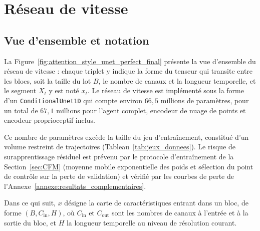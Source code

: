 \section*{Réseau de vitesse}

\subsection*{Vue d'ensemble et notation}
La Figure~\ref{fig:attention_style_unet_perfect_final} présente la vue d'ensemble du réseau de vitesse : chaque triplet y indique la forme du tenseur qui transite entre les blocs, soit la taille du lot $B$, le nombre de canaux et la longueur temporelle, et le segment $X_t$ y est noté $x_t$. Le réseau de vitesse est implémenté sous la forme d'un \texttt{ConditionalUnet1D} qui compte environ $66{,}5$ millions de paramètres, pour un total de $67{,}1$ millions pour l'agent complet, encodeur de nuage de points et encodeur proprioceptif inclus.

Ce nombre de paramètres excède la taille du jeu d'entraînement, constitué d'un volume restreint de trajectoires (Tableau~\ref{tab:jeux_donnees}). Le risque de surapprentissage résiduel est prévenu par le protocole d'entraînement de la Section~\ref{sec:CFM} (moyenne mobile exponentielle des poids et sélection du point de contrôle sur la perte de validation) et vérifié par les courbes de perte de l'Annexe~\ref{annexe:resultats_complementaires}.

Dans ce qui suit, $x$ désigne la carte de caractéristiques entrant dans un bloc, de forme $(B, C_{\text{in}}, H)$, où $C_{\text{in}}$ et $C_{\text{out}}$ sont les nombres de canaux à l'entrée et à la sortie du bloc, et $H$ la longueur temporelle au niveau de résolution courant.

